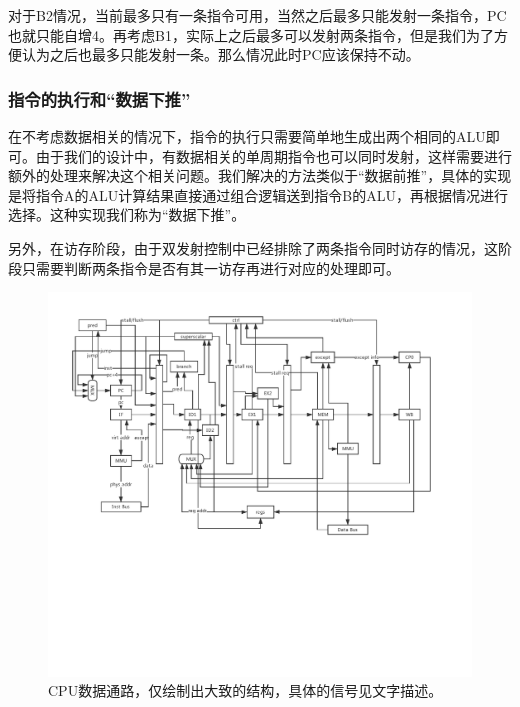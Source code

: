对于B2情况，当前最多只有一条指令可用，当然之后最多只能发射一条指令，PC也就只能自增4。再考虑B1，实际上之后最多可以发射两条指令，但是我们为了方便认为之后也最多只能发射一条。那么情况此时PC应该保持不动。

\subsubsection{指令的执行和``数据下推''}
在不考虑数据相关的情况下，指令的执行只需要简单地生成出两个相同的ALU即可。由于我们的设计中，有数据相关的单周期指令也可以同时发射，这样需要进行额外的处理来解决这个相关问题。我们解决的方法类似于``数据前推''，具体的实现是将指令A的ALU计算结果直接通过组合逻辑送到指令B的ALU，再根据情况进行选择。这种实现我们称为``数据下推''。

另外，在访存阶段，由于双发射控制中已经排除了两条指令同时访存的情况，这阶段只需要判断两条指令是否有其一访存再进行对应的处理即可。

\begin{landscape}
\begin{figure}[htbp]
	\centering
	\includegraphics[width=\linewidth]{datapath.pdf}
	\caption{CPU数据通路，仅绘制出大致的结构，具体的信号见文字描述。}
	\label{fig:cpu-datapath}
\end{figure}
\end{landscape}
